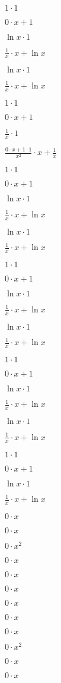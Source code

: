 $1 \cdot 1$

$0 \cdot x+1$

$ \ln x \cdot 1$

$ \frac{1}{x}  \cdot x+ \ln x$

$ \ln x \cdot 1$

$ \frac{1}{x}  \cdot x+ \ln x$

$1 \cdot 1$

$0 \cdot x+1$

$ \frac{1}{x}  \cdot 1$

$ \frac{0 \cdot x+1 \cdot 1}{x^{2}}  \cdot x+ \frac{1}{x} $

$1 \cdot 1$

$0 \cdot x+1$

$ \ln x \cdot 1$

$ \frac{1}{x}  \cdot x+ \ln x$

$ \ln x \cdot 1$

$ \frac{1}{x}  \cdot x+ \ln x$

$1 \cdot 1$

$0 \cdot x+1$

$ \ln x \cdot 1$

$ \frac{1}{x}  \cdot x+ \ln x$

$ \ln x \cdot 1$

$ \frac{1}{x}  \cdot x+ \ln x$

$1 \cdot 1$

$0 \cdot x+1$

$ \ln x \cdot 1$

$ \frac{1}{x}  \cdot x+ \ln x$

$ \ln x \cdot 1$

$ \frac{1}{x}  \cdot x+ \ln x$

$1 \cdot 1$

$0 \cdot x+1$

$ \ln x \cdot 1$

$ \frac{1}{x}  \cdot x+ \ln x$

$0 \cdot x$

$0 \cdot x$

$0 \cdot x^{2}$

$0 \cdot x$

$0 \cdot x$

$0 \cdot x$

$0 \cdot x$

$0 \cdot x$

$0 \cdot x$

$0 \cdot x^{2}$

$0 \cdot x$

$0 \cdot x$

